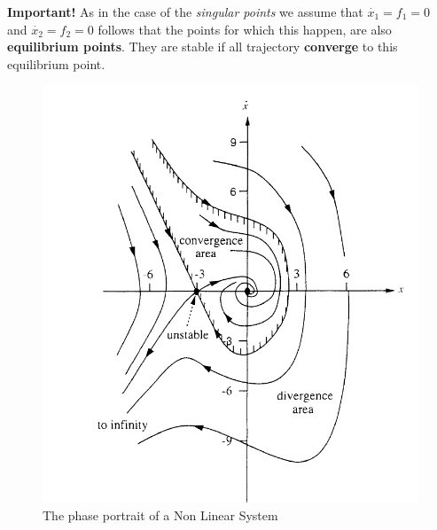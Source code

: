 \noindent
\textbf{Important!} As in the case of the \textit{singular points} we assume that $\dot{x_1}=f_1=0 $ and $\dot{x_2}=f_2=0$ follows that the points for which this happen, are also \textbf{equilibrium points}. They are stable if all trajectory \textbf{converge} to this equilibrium point.

\begin{figure}[h]
    \centering
    \includegraphics[scale=0.55]{NonLinearControl/images/SingularPoints.png}
    \caption{The phase portrait of a Non Linear System}
    \label{fig:phase}
\end{figure}

